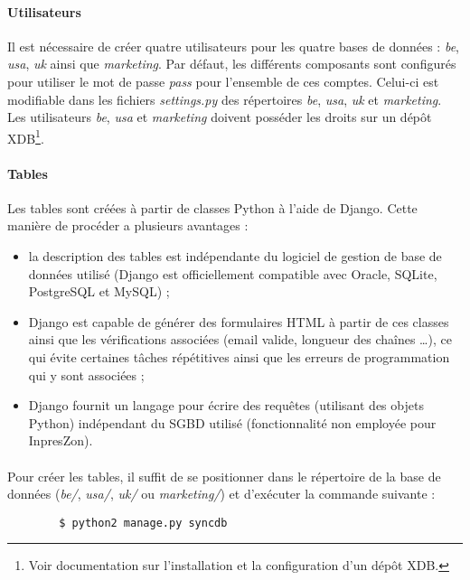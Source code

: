 \documentclass[a4paper,12pt,french]{article}
\begin{document}
    \paragraph{Utilisateurs}
    Il est nécessaire de créer quatre utilisateurs pour les quatre bases de
données :
\textit{be}, \textit{usa}, \textit{uk} ainsi que \textit{marketing}. Par
défaut, les différents composants sont configurés pour utiliser le mot de passe
\textit{pass} pour l'ensemble de ces comptes. Celui-ci est modifiable dans les
fichiers \textit{settings.py} des répertoires \textit{be}, \textit{usa},
\textit{uk} et \textit{marketing}.
    Les utilisateurs \textit{be}, \textit{usa} et \textit{marketing} doivent
posséder les droits sur un dépôt XDB\footnote{Voir documentation sur
l'installation et la configuration d'un dépôt XDB.}.

    \paragraph{Tables}
    Les tables sont créées à partir de classes Python à l'aide de Django. Cette
manière de procéder a plusieurs avantages :
   \begin{itemize}
        \item la description des tables est indépendante du logiciel de gestion
de base de données utilisé (Django est officiellement compatible avec Oracle,
SQLite, PostgreSQL et MySQL) ;
        \item Django est capable de générer des formulaires HTML à partir de
ces classes ainsi que les vérifications associées (email valide, longueur des
chaînes \dots), ce qui évite certaines tâches répétitives ainsi que les erreurs
de programmation qui y sont associées ;
        \item Django fournit un langage pour écrire des requêtes (utilisant
des objets Python) indépendant du SGBD utilisé (fonctionnalité non employée
pour InpresZon).
    \end{itemize}

    \paragraph{}
    Pour créer les tables, il suffit de se positionner dans le répertoire de la
base de données (\textit{be/}, \textit{usa/}, \textit{uk/} ou
\textit{marketing/}) et d'exécuter la commande suivante :
    \begin{lstlisting}
        $ python2 manage.py syncdb
    \end{lstlisting}
\end{document}
